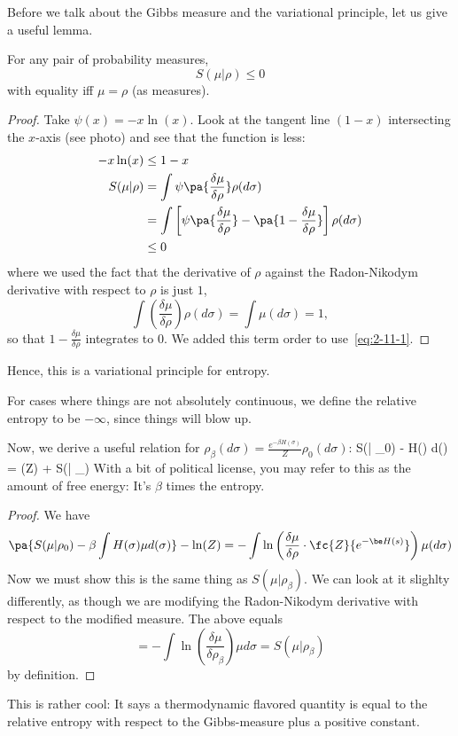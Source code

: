 Before we talk about the Gibbs measure and the variational principle, let us give a useful lemma.

\begin{lem} For any pair of probability measures, %
\[
S(\mu | \rho) \leq 0
\]
with equality iff $\mu = \rho$ (as measures).
\end{lem}
\begin{proof}
Take $\psi(x) = -x\ln(x)$. Look at the tangent line $(1 - x)$ intersecting the $x$-axis (see photo) and see that the function is less: 
\begin{align}
-x \ln(x) &\leq 1 - x
\label{eq:2-11-1}
\\
\nonumber
S(\mu | \rho) &= 
\int  \psi\pa{\frac{\delta\mu}{\delta\rho}} \rho(d\sigma)\\
\nonumber
&=\int \left[ \psi\pa{\frac{\delta\mu}{\delta\rho}} - \pa{1 - \frac{\delta\mu}{\delta\rho}}\right]\rho(d\sigma)\\
\nonumber &\leq 0
\end{align}
where we used the fact that the derivative of $\rho$ against the Radon-Nikodym derivative with respect to $\rho$ is just $1$, \[\int \left(\frac{\delta \mu}{\delta \rho} \right) \rho (d\sigma )= \int \mu (d\sigma) = 1,\] 
so that $1-\frac{\delta\mu}{\delta\rho}$ integrates to $0$. We added this term order to use~\eqref{eq:2-11-1}. 
\end{proof}
Hence, this is a variational principle for entropy. 

\begin{rem}
For cases where things are not absolutely continuous, we define the relative entropy to be $-\infty$, since things will blow up. 
\end{rem}

Now, we derive a useful relation for  $\rho_{\beta}(d\sigma)  = \frac{e^{-\beta H(\sigma)}}{Z} \rho_0 (d\sigma)$:
S(\mu | \rho_0) - \beta \int H(\sigma) \mu d(\sigma) = \ln(Z) + S(\mu | \rho_{\beta})
\eeq
With a bit of political license, you may refer to this as the amount of free energy: It's $\beta$ times the entropy. %
\begin{proof}
We have
\[
\pa{S(\mu | \rho_0) - \beta \int H(\sigma) \mu d(\sigma)} - \ln (Z)=
-\int \ln\left(\frac{\delta\mu}{\delta\rho}\cdot \fc{Z}{e^{-\be H(s)}}\right) \mu (d\sigma )
\]
Now we must show this is the same thing as $S(\mu | \rho_{\beta})$. We can look at it slighlty differently, as though we are modifying the Radon-Nikodym derivative with respect to the modified measure. The above equals
\[
= -\int \ln\left(\frac{\delta\mu}{\delta\rho_{\beta}}\right) \mu d\sigma = S(\mu|\rho_{\beta})
\]
by definition. 
\end{proof}
This is rather cool: It says a thermodynamic flavored quantity is equal to the relative entropy with respect to the Gibbs-measure plus a positive constant. %

